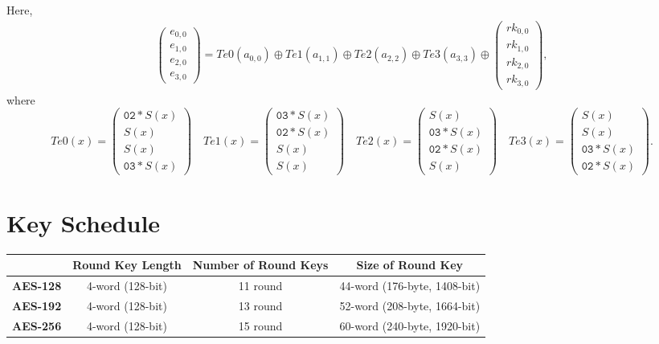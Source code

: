 \newpage
\begin{center}

\end{center}
Here, \begin{align*}
	\begin{pmatrix} e_{0,0} \\ e_{1,0} \\ e_{2,0} \\ e_{3,0} 
	\end{pmatrix} = Te0(a_{0,0})\oplus Te1(a_{1,1}) \oplus Te2(a_{2,2}) \oplus Te3(a_{3,3}) \oplus
	\begin{pmatrix} rk_{0,0} \\ rk_{1,0} \\ rk_{2,0} \\ rk_{3,0}
	\end{pmatrix},
\end{align*} where \[
Te0(x)=\begin{pmatrix}\texttt{02} * S(x) \\ S(x) \\ S(x) \\ \texttt{03} * S(x)
\end{pmatrix}\quad Te1(x)=\begin{pmatrix}\texttt{03} * S(x) \\ \texttt{02} * S(x) \\ S(x) \\ S(x)
\end{pmatrix}\quad Te2(x)=\begin{pmatrix}S(x) \\ \texttt{03} * S(x) \\ \texttt{02} * S(x) \\ S(x)
\end{pmatrix}\quad Te3(x)=\begin{pmatrix}S(x) \\ S(x) \\ \texttt{03} * S(x) \\ \texttt{02} * S(x)
\end{pmatrix}.
\]

\section{Key Schedule}

\begin{table}[h!]\centering
{\begin{tabular}{c|c|c|c} \toprule[1.2pt]
	& \textbf{Round Key Length} & \textbf{Number of Round Keys} & \textbf{Size of Round Key} \\ \hline\hline
	\textbf{AES-128} & 4-word (128-bit) & 11 round & 44-word (176-byte, 1408-bit) \\ \hline
	\textbf{AES-192} & 4-word (128-bit) & 13 round & 52-word (208-byte, 1664-bit) \\ \hline
	\textbf{AES-256} & 4-word (128-bit) & 15 round & 60-word (240-byte, 1920-bit) \\ \bottomrule[1.2pt]
\end{tabular}}
\end{table}

